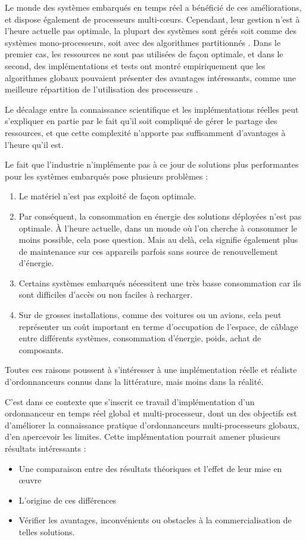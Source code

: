 \documentclass[11pt,a4paper,oneside]{report}
\begin{document}
	Le monde des systèmes embarqués en temps réel a bénéficié de ces améliorations, 
	et dispose également de processeurs multi-c\oe{}urs. Cependant, leur gestion n'est 
	à l'heure actuelle pas optimale, la plupart des systèmes sont  
	gérés soit comme des systèmes mono-processeurs, soit avec des algorithmes partitionnés \cite{paolillo_new_nodate}. 
	Dans le premier cas, les ressources ne sont pas utilisées de façon optimale, 
	et dans le second, des implémentations et tests ont montré empiriquement 
	que les algorithmes globaux pouvaient présenter des avantages intéressants, comme 
	une meilleure répartition de l'utilisation des processeurs \cite{baker_analysis_2005}. 
	\medskip
	
	Le décalage entre la connaissance scientifique et les implémentations réelles 
	peut s'expliquer en partie par le fait qu'il soit compliqué de gérer le partage des ressources, 
	et que cette complexité n'apporte pas suffisamment d'avantages à l'heure qu'il est.\medskip
	
	Le fait que l'industrie n'implémente pas à ce jour de solutions plus \og performantes \fg{} 
	pour les systèmes embarqués pose plusieurs problèmes :
	\begin{enumerate}
		\item Le matériel n'est pas exploité de façon optimale.
		\item Par conséquent, la consommation en énergie des solutions déployées n'est 
		pas optimale.
		À l'heure actuelle, dans un monde où l'on cherche à consommer le moins possible, 
		cela pose question. Mais au delà, cela signifie également plus de maintenance 
		sur ces appareils parfois sans source de renouvellement d'énergie.
		\item Certains systèmes embarqués nécessitent une très basse consommation car 
		ils sont difficiles d'accès ou non faciles à recharger.
		\item Sur de grosses installations, comme des voitures ou un avions, cela peut représenter 
		un coût important en terme d'occupation de l'espace, de câblage entre différents systèmes, 
		consommation d'énergie, poids, achat de composants.
	\end{enumerate}
	
	Toutes ces raisons poussent à s'intéresser à une implémentation réelle et réaliste 
	d'ordonnanceurs connus dans la littérature, mais moins dans la réalité.
	
	C'est dans ce contexte que s'inscrit ce travail d'implémentation d'un ordonnanceur en temps réel 
	global et multi-processeur, dont un des objectifs est d'améliorer la connaissance pratique 
	d'ordonnanceurs multi-processeurs globaux, d'en apercevoir les limites. 
	Cette implémentation pourrait amener plusieurs résultats intéressants : \medskip
	\begin{itemize}
		\item Une comparaison entre des résultats théoriques et l'effet de leur mise 
		en \oe{}uvre
		\item L'origine de ces différences
		\item Vérifier les avantages, inconvénients ou obstacles à la 
		commercialisation de telles solutions.
	\end{itemize}
	
\end{document}
